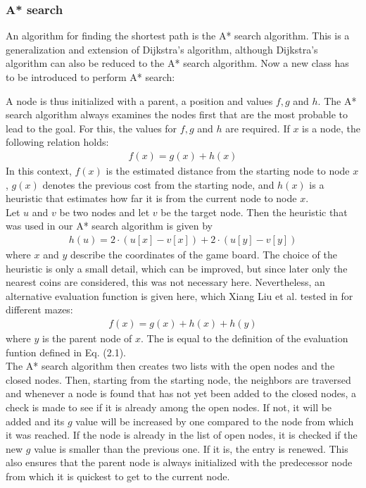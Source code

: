 \subsubsection*{A* search}
An algorithm for finding the shortest path is the A* search algorithm. This is a generalization and extension of Dijkstra's algorithm, although Dijkstra's algorithm can also be reduced to the A* search algorithm. Now a new class has to be introduced to perform A* search:
\vspace{0.1cm}

\vspace{0.1cm}
A node is thus initialized with a parent, a position and values $f,g$ and $h$. The A* search algorithm always examines the nodes first that are the most probable to lead to the goal. For this, the values for $f,g$ and $h$ are required. If $x$ is a node, the following relation holds:
\begin{align}
f(x) = g(x) + h(x)
\end{align}
In this context, $f(x)$ is the estimated distance from the starting node to node $x$, $g(x)$ denotes the previous cost from the starting node, and $h(x)$ is a heuristic that estimates how far it is from the current node to node $x$.
\\
 
Let $u$ and $v$ be two nodes and let $v$ be the target node. Then the heuristic that was used in our A* search algorithm is given by
\begin{align*}
h(u) = 2\cdot(u[x] - v[x]) + 2\cdot(u[y]-v[y])
\end{align*}
where $x$ and $y$ describe the coordinates of the game board. The choice of the heuristic is only a small detail, which can be improved, but since later only the nearest coins are considered, this was not necessary here. Nevertheless, an alternative evaluation function is given here, which Xiang Liu et al. tested in \cite{liu2011} for different mazes:
\begin{align*}
f(x) = g(x)+h(x)+h(y)
\end{align*}
where $y$ is the parent node of $x$. The is equal to the definition of the evaluation funtion defined in Eq. (2.1).
\\

The A* search algorithm then creates two lists with the open nodes and the closed nodes. Then, starting from the starting node, the neighbors are traversed and whenever a node is found that has not yet been added to the closed nodes, a check is made to see if it is already among the open nodes. If not, it will be added and its $g$ value will be increased by one compared to the node from which it was reached. If the node is already in the list of open nodes, it is checked if the new $g$ value is smaller than the previous one. If it is, the entry is renewed. This also ensures that the parent node is always initialized with the predecessor node from which it is quickest to get to the current node.
\\

